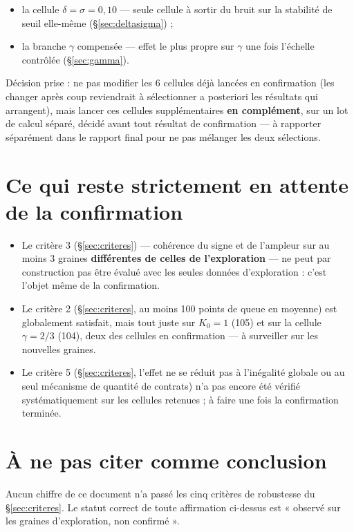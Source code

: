 \documentclass[11pt,a4paper]{article}
\begin{document}
\begin{itemize}
\item la cellule $\delta=\sigma=0{,}10$ --- seule cellule à sortir du
  bruit sur la stabilité de seuil elle-même (\S\ref{sec:deltasigma}) ;
\item la branche $\gamma$ compensée --- effet le plus propre sur
  $\gamma$ une fois l'échelle contrôlée (\S\ref{sec:gamma}).
\end{itemize}

Décision prise : ne pas modifier les 6 cellules déjà lancées en
confirmation (les changer après coup reviendrait à sélectionner a
posteriori les résultats qui arrangent), mais lancer ces cellules
supplémentaires \textbf{en complément}, sur un lot de calcul séparé,
décidé avant tout résultat de confirmation --- à rapporter séparément
dans le rapport final pour ne pas mélanger les deux sélections.

\section{Ce qui reste strictement en attente de la confirmation}

\begin{itemize}
\item Le critère 3 (\S\ref{sec:criteres}) --- cohérence du signe et de
  l'ampleur sur au moins 3 graines \textbf{différentes de celles de
  l'exploration} --- ne peut par construction pas être évalué avec les
  seules données d'exploration : c'est l'objet même de la confirmation.
\item Le critère 2 (\S\ref{sec:criteres}, au moins 100 points de queue
  en moyenne) est globalement satisfait, mais tout juste sur $K_0=1$
  (105) et sur la cellule $\gamma=2/3$ (104), deux des cellules en
  confirmation --- à surveiller sur les nouvelles graines.
\item Le critère 5 (\S\ref{sec:criteres}, l'effet ne se réduit pas à
  l'inégalité globale ou au seul mécanisme de quantité de contrats) n'a
  pas encore été vérifié systématiquement sur les cellules retenues ; à
  faire une fois la confirmation terminée.
\end{itemize}

\section*{À ne pas citer comme conclusion}

Aucun chiffre de ce document n'a passé les cinq critères de robustesse
du \S\ref{sec:criteres}. Le statut correct de toute affirmation
ci-dessus est « observé sur les graines d'exploration, non confirmé ».
\end{document}
